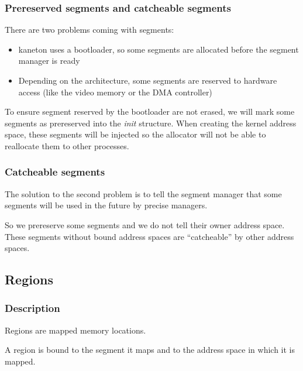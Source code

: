 
\begin{frame}
  \frametitle{Prereserved segments and catcheable segments}

  There are two problems coming with segments:

  \begin{itemize}
  \item kaneton uses a bootloader, so some segments are allocated before the segment manager is ready
  \item Depending on the architecture, some segments are reserved to hardware access (like the video memory or the DMA controller)
  \end{itemize}

  \-

  To ensure segment reserved by the bootloader are not erased, we will
  mark   some   segments   as   prereserved   into   the   \emph{init}
  structure. When  creating the  kernel address space,  these segments
  will be  injected so  the allocator will  not be able  to reallocate
  them to other processes.

\end{frame}


\begin{frame}
  \frametitle{Catcheable segments}

  The solution  to the second problem  is to tell  the segment manager
  that some segments will be used in the future by precise managers.

  \-

  So  we prereserve  some  segments and  we  do not  tell their  owner
  address  space.  These segments  without  bound  address spaces  are
  ``catcheable'' by other address spaces.

\end{frame}

%
%

\subsection{Regions}


\begin{frame}
  \frametitle{Description}

  Regions are mapped memory locations.

  \-

  A region is bound to the segment it maps and to the address space in
  which it is mapped.

\end{frame}


